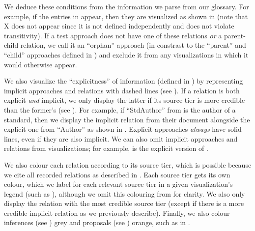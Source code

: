 \ifnotpaper
    \noindent
    We deduce these conditions from the information we parse from our glossary.
    For example, if the entries in  appear, then
    they are visualized as shown in  (note that X
    does not appear since it is not defined independently and does not violate
    transitivity). If a test approach does not have one of these relations
    \emph{or} a parent-child relation, we call it an ``orphan'' approach
    (in constrast to the ``parent'' and ``child'' approaches defined in
    ) and exclude it from any visualizations in which it
    would otherwise appear.

    
    \ExampleSynGraph{}

    \label{visExplicit}
    We also visualize the ``explicitness'' of information (defined in
    ) by representing implicit approaches and relations
    with dashed lines (see ).
    If a relation is both explicit \emph{and} implicit, we only display the
    latter if its source tier is more credible than the former's (see
    ). For example, if
    ``StdAuthor'' from  is the author of a
    standard, then we display the implicit relation from their
    document alongside the explicit one from ``Author'' as shown in
    .
    Explicit approaches
    \emph{always} have solid lines, even if they are also implicit. We
    can also omit implicit approaches and relations from visualizations; for
    example,  is the explicit version of
    . %

    \clearpage
    We also colour each relation according to its source tier, which is
    possible because we cite all recorded relations as described in
    . Each source tier gets its own colour, which we label
    for each relevant source tier in a given visualization's legend
    (such as ), although we omit this
    colouring from  for
    clarity. We also only display the relation with the most credible source
    tier (except if there is a more credible implicit relation as we previously
    describe). Finally, we also colour inferences (see ) grey and
    proposals (see ) orange, such as in \recFigs{}.

